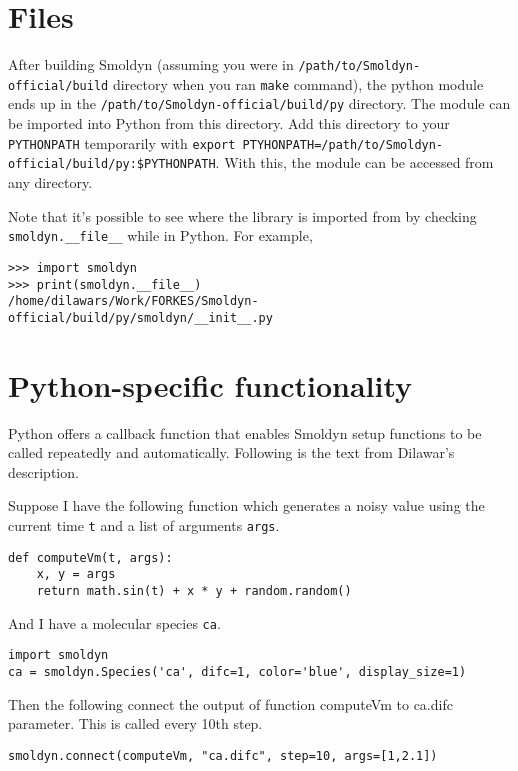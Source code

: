 \documentclass {book}
\newcommand {\ttt} {\texttt}
\begin{document}
\section{Files}

After building Smoldyn (assuming you were in \ttt{/path/to/Smoldyn-official/build} directory when you ran \ttt{make} command), the python module ends up in the \ttt{/path/to/Smoldyn-official/build/py} directory. The module can be imported into Python from this directory. Add this directory to your
\ttt{PYTHONPATH} temporarily with \ttt{export PTYHONPATH=/path/to/Smoldyn-official/build/py:\$PYTHONPATH}. With this, the module can be accessed from any directory.

Note that it's possible to see where the library is imported from by checking
\verb|smoldyn.__file__| while in Python. For example,

\begin{verbatim}
>>> import smoldyn
>>> print(smoldyn.__file__)
/home/dilawars/Work/FORKES/Smoldyn-official/build/py/smoldyn/__init__.py
\end{verbatim}


\section{Python-specific functionality}

Python offers a callback function that enables Smoldyn setup functions to be called repeatedly and automatically. Following is the text from Dilawar's description.

Suppose I have the following function which generates a noisy value using the current time \ttt{t} and a list of arguments \ttt{args}.

\begin{verbatim}
def computeVm(t, args):
    x, y = args 
    return math.sin(t) + x * y + random.random()
\end{verbatim}

And I have a molecular species \ttt{ca}.

\begin{verbatim}
import smoldyn
ca = smoldyn.Species('ca', difc=1, color='blue', display_size=1)
\end{verbatim}
Then the following connect the output of function computeVm to ca.difc parameter. This is called every 10th step.

\begin{verbatim}
smoldyn.connect(computeVm, "ca.difc", step=10, args=[1,2.1])
\end{verbatim}
\end{document}
